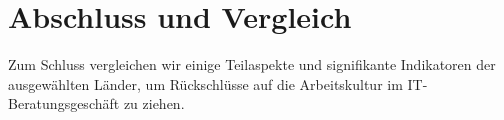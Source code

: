 \section{Abschluss und Vergleich}
Zum Schluss vergleichen wir einige Teilaspekte und signifikante Indikatoren der ausgewählten Länder, um Rückschlüsse auf die Arbeitskultur im IT-Beratungsgeschäft zu ziehen.
